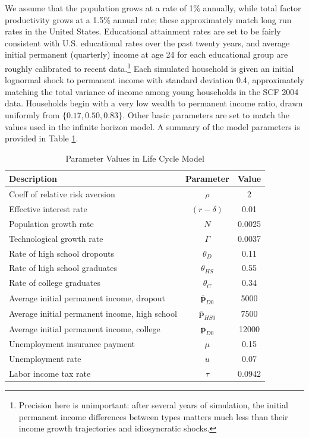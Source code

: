 \documentclass{econtex}\usepackage[pdftex]{graphicx}\usepackage{epstopdf} \usepackage[pdftex]{hyperref}
\newcommand{\CRRA}{\ensuremath{\rho}}
\newcommand{\pLev}{\ensuremath{\pmb{p}}}
\newcommand{\rProd}{\ensuremath{\mathit{r}}}
\newcommand{\urate}{\ensuremath{u}}
\begin{document}
We assume that the population grows at a rate of 1\% annually, while total factor productivity grows at a 1.5\% annual rate; these approximately match long run rates in the United States.  Educational attainment rates are set to be fairly consistent with U.S. educational rates over the past twenty years, and average initial permanent (quarterly) income at age 24 for each educational group are roughly calibrated to recent data.\footnote{Precision here is unimportant: after several years of simulation, the initial permanent income differences between types matters much less than their income growth trajectories and idiosyncratic shocks.}  Each simulated household is given an initial lognormal shock to permanent income with standard deviation 0.4, approximately matching the total variance of income among young households in the SCF 2004 data.  Households begin with a very low wealth to permanent income ratio, drawn uniformly from $\{0.17,0.50,0.83\}$.  Other basic parameters are set to match the values used in the infinite horizon model.  A summary of the model parameters is provided in Table \ref{table:ParametersLifeCycle}.

\begin{table}
\caption{Parameter Values in Life Cycle Model}
\label{table:ParametersLifeCycle}
\begin{center}
\begin{tabular}{l c c}
\toprule
Description & Parameter & Value \\
\midrule
Coeff of relative risk aversion & \CRRA & 2 \\
Effective interest rate & $(\rProd - \delta)$ & 0.01 \\
Population growth rate & $N$ & 0.0025 \\
Technological growth rate & $\Gamma$ & 0.0037 \\
Rate of high school dropouts & $\theta_D$ & 0.11 \\
Rate of high school graduates & $\theta_{HS}$ & 0.55 \\
Rate of college graduates & $\theta_C$ & 0.34 \\
Average initial permanent income, dropout & $\overline{\pLev}_{D0}$ & 5000 \\
Average initial permanent income, high school & $\overline{\pLev}_{HS0}$ & 7500 \\
Average initial permanent income, college & $\overline{\pLev}_{D0}$ & 12000 \\
Unemployment insurance payment & $\mu$ & 0.15 \\
Unemployment rate & $\urate$ & 0.07 \\
Labor income tax rate & $\tau$ & 0.0942 \\
\bottomrule
\end{tabular}
\end{center}
\end{table}
\end{document}
